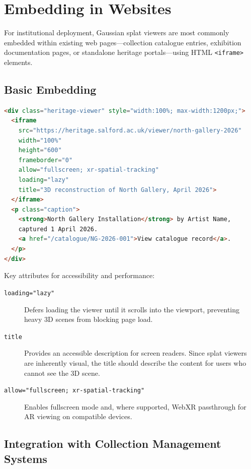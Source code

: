 \section{Embedding in Websites}
\label{sec:view-embed}

For institutional deployment, Gaussian splat viewers are most commonly embedded within existing web pages---collection catalogue entries, exhibition documentation pages, or standalone heritage portals---using HTML \texttt{<iframe>} elements.

\subsection{Basic Embedding}

\begin{lstlisting}[language=HTML, caption={Embedding a splat viewer in an existing web page.}, label={lst:embed-iframe}]
<div class="heritage-viewer" style="width:100%; max-width:1200px;">
  <iframe
    src="https://heritage.salford.ac.uk/viewer/north-gallery-2026"
    width="100%"
    height="600"
    frameborder="0"
    allow="fullscreen; xr-spatial-tracking"
    loading="lazy"
    title="3D reconstruction of North Gallery, April 2026">
  </iframe>
  <p class="caption">
    <strong>North Gallery Installation</strong> by Artist Name,
    captured 1 April 2026.
    <a href="/catalogue/NG-2026-001">View catalogue record</a>.
  </p>
</div>
\end{lstlisting}

Key attributes for accessibility and performance:

\begin{description}
  \item[\texttt{loading="lazy"}] Defers loading the viewer until it scrolls into the viewport, preventing heavy 3D scenes from blocking page load.
  \item[\texttt{title}] Provides an accessible description for screen readers. Since splat viewers are inherently visual, the title should describe the content for users who cannot see the 3D scene.
  \item[\texttt{allow="fullscreen; xr-spatial-tracking"}] Enables fullscreen mode and, where supported, WebXR passthrough for AR viewing on compatible devices.
\end{description}

\subsection{Integration with Collection Management Systems}

